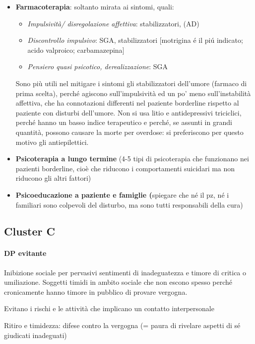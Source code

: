 \begin{itemize}
\item
  \textbf{Farmacoterapia}: soltanto mirata ai sintomi, quali:
\begin{itemize}
\item
  \emph{Impulsività/ disregolazione affettiva}: stabilizzatori, (AD)
\item
  \emph{Discontrollo impulsivo}: SGA, stabilizzatori {[}motrigina é il
  piú indicato; acido valproico; carbamazepina{]}
\item
  \emph{Pensiero quasi psicotico, derealizzazione}: SGA
\end{itemize}

Sono più utili nel mitigare i sintomi gli stabilizzatori dell'umore
(farmaco di prima scelta), perché agiscono sull'impulsività ed un po'
meno sull'instabilità affettiva, che ha connotazioni differenti nel
paziente borderline rispetto al paziente con disturbi dell'umore. Non si
usa litio e antidepressivi triciclici, perché hanno un basso indice
terapeutico e perché, se assunti in grandi quantità, possono causare la
morte per overdose: si preferiscono per questo motivo gli
antiepilettici.

\item
  \textbf{Psicoterapia a lungo termine} (4-5 tipi di psicoterapia che
  funzionano nei pazienti borderline, cioè che riducono i comportamenti
  suicidari ma non riducono gli altri fattori)
\item
  \textbf{Psicoeducazione a paziente e famiglie (}spiegare che né il pz,
  né i familiari sono colpevoli del disturbo, ma sono tutti responsabili
  della cura)
\end{itemize}

\subsection{Cluster C}

\paragraph{DP evitante}

Inibizione sociale per pervasivi sentimenti di inadeguatezza e timore di
critica o umiliazione. Soggetti timidi in ambito sociale che non escono
spesso perché cronicamente hanno timore in pubblico di provare vergogna.

Evitano i rischi e le attività che implicano un contatto interpersonale

Ritiro e timidezza: difese contro la vergogna (= paura di rivelare
aspetti di sé giudicati inadeguati)

